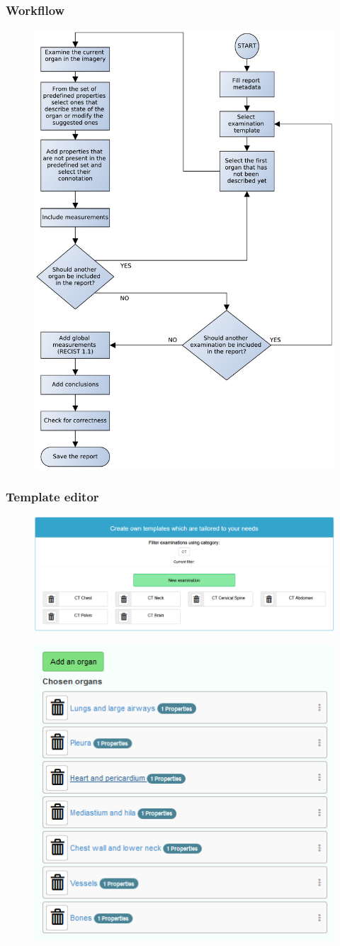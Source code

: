 \documentclass{beamer}
\begin{document}
\begin{frame}
\frametitle{Workfllow}
\begin{figure}
	\centering
	\includegraphics[width=0.5\linewidth]{../report-workflow}
	\label{fig:report-workflow}
\end{figure}
\end{frame}

\begin{frame}
\frametitle{Template editor}
\begin{figure}
	\centering
	\includegraphics[width=1\linewidth]{../templates-list}
	\label{fig:templates-list}
\end{figure}

\end{frame}
\begin{frame}
\begin{figure}
	\centering
	\includegraphics[width=0.5\linewidth]{../template-organs-list}
	\label{fig:template-organ-list}
\end{figure}
\end{frame}
\end{document}

